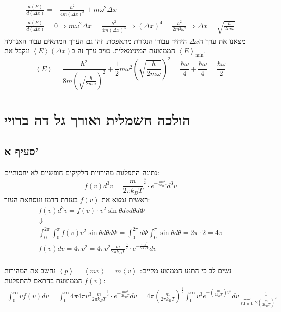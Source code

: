 \documentclass{article}
\newcommand{\angular}[1]{\left\langle{#1}\right\rangle} %
\newcommand{\p}[1]{\left({#1}\right)}                   %
\newcommand{\n}{\newline}                       %
\newcommand{\vtab}{\vspace{1em}\noindent}       %
\newcommand{\ds}{\textendash\;}                 %
\begin{document}
\vtab
\begin{gather*}
    \frac{d\angular{E}}{d\p{\Delta x}} = -\frac{\hbar^2}{4m\p{\Delta x}^3} + m\omega^2 \Delta x \\
    \frac{d\angular{E}}{d\p{\Delta x}} = 0 \Rightarrow m\omega^2 \Delta x = \frac{\hbar^2}{4m\p{\Delta x}^3} 
    \Rightarrow \p{\Delta x}^4 = \frac{\hbar^2}{2m^2\omega^2} \Rightarrow \Delta x = \sqrt{\frac{\hbar}{2m\omega}}
\end{gather*}
מצאנו את ערך ה\ds$\Delta x$ היחיד עבורו הנגזרת מתאפסת. זהו גם הערך המתאים עבור האנרגיה הממוצעת המינימאלית.\n
נציב ערך זה ב\ds$\angular{E}\p{\Delta x}$ ונקבל את $\angular{E}_{\min}$.
\[
    \angular{E} = \boxed{\frac{\hbar^2}{8m\p{\sqrt{\frac{\hbar}{2m\omega}}}^2} + \frac{1}{2}m\omega^2 \p{\sqrt{\frac{\hbar}{2m\omega}}}^2} 
    = \frac{\hbar \omega}{4} + \frac{\hbar \omega}{4} = \boxed{\frac{\hbar \omega}{2}}
\]

\section{הולכה חשמלית ואורך גל דה ברויי}
\subsection*{סעיף א'}
נתונה התפלגות מהירויות חלקיקים חופשיים לא יחסותיים: 
\[
    f(v)d^3v = \frac{m}{2\pi k_B T}^\frac{3}{2} \cdot e^{-\frac{mv^2}{2k_BT}}d^3v
\]
ראשית נמצא את $f(v)$ בעזרת הרמז ונוסחאת העזר:
\begin{gather*}
    f(v) d^3v = f(v)\cdot v^2 \sin{\theta} dv d\theta d\Phi \\
    \Downarrow\\
    \int_0^{2\pi}\int_0^{\pi} f(v)v^2 \sin{\theta} d\theta d\Phi = \int_0^{2\pi} d\Phi \int_{0}^{\pi} \sin{\theta}d\theta = 2\pi \cdot 2 = 4\pi
    \\
    f(v)dv = 4\pi v^2 = 4\pi v^2 \frac{m}{2\pi k_B T}^\frac{3}{2} \cdot e^{-\frac{mv^2}{2k_BT}}dv
    \\
\end{gather*}

נשים לב כי התנע הממוצע מקיים: $\angular{p} = \angular{mv} = m \angular{v}$\n
נחשב את המהירות הממוצעת בהתאם להתפלגות $f(v)$:
\begin{align*}
    \int_0^\infty vf(v)dv = \int_0^\infty 4\pi 4\pi v^3 \frac{m}{2\pi k_B T}^\frac{3}{2} \cdot e^{-\frac{mv^2}{2k_BT}}dv =
    4\pi \p{\frac{m}{2\pi k_B T}}^\frac{3}{2} \int_0^\infty v^3 e^{-\p{\frac{m}{2k_B T}}v^2}dv \underbrace{=}_{\text{\L{hint}}} \frac{1}{2\p{\frac{m}{2k_B T}}^2}
\end{align*}
\end{document}
